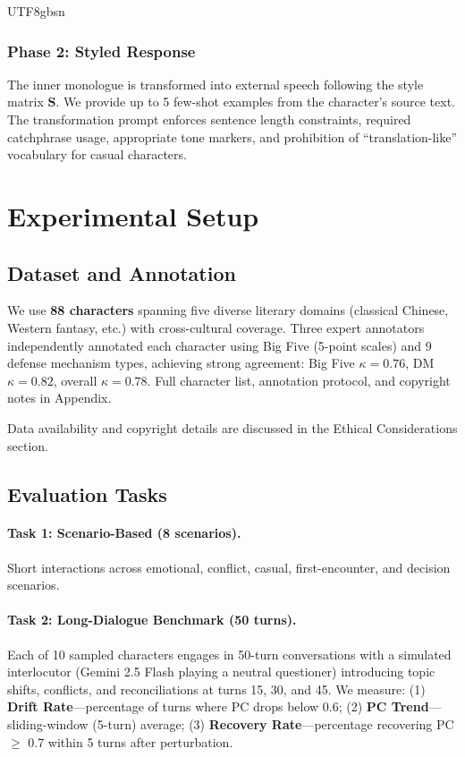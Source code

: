 \documentclass[11pt]{article}
\begin{document}
\begin{CJK*}{UTF8}{gbsn}
\subsubsection{Phase 2: Styled Response}

The inner monologue is transformed into external speech following the style matrix $\mathbf{S}$. We provide up to 5 few-shot examples from the character's source text. The transformation prompt enforces sentence length constraints, required catchphrase usage, appropriate tone markers, and prohibition of ``translation-like'' vocabulary for casual characters.


\section{Experimental Setup}

\subsection{Dataset and Annotation}

We use \textbf{88 characters} spanning five diverse literary domains (classical Chinese, Western fantasy, etc.) with cross-cultural coverage. Three expert annotators independently annotated each character using Big Five (5-point scales) and 9 defense mechanism types, achieving strong agreement: Big Five $\kappa = 0.76$, DM $\kappa = 0.82$, overall $\kappa = 0.78$. Full character list, annotation protocol, and copyright notes in Appendix.

Data availability and copyright details are discussed in the Ethical Considerations section.


\subsection{Evaluation Tasks}

\paragraph{Task 1: Scenario-Based (8 scenarios).} Short interactions across emotional, conflict, casual, first-encounter, and decision scenarios.

\paragraph{Task 2: Long-Dialogue Benchmark (50 turns).} Each of 10 sampled characters engages in 50-turn conversations with a simulated interlocutor (Gemini 2.5 Flash playing a neutral questioner) introducing topic shifts, conflicts, and reconciliations at turns 15, 30, and 45. We measure: (1) \textbf{Drift Rate}---percentage of turns where PC drops below 0.6; (2) \textbf{PC Trend}---sliding-window (5-turn) average; (3) \textbf{Recovery Rate}---percentage recovering PC $\geq$ 0.7 within 5 turns after perturbation.



\end{CJK*}
\end{document}
